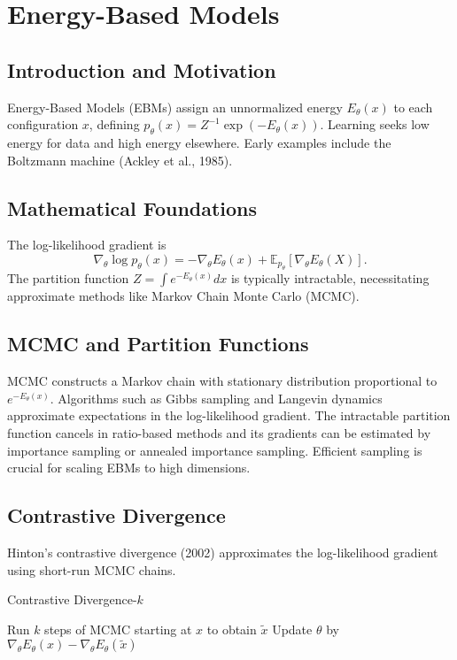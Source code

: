 \documentclass[11pt]{book}
\begin{document}
\section{Energy-Based Models}
\subsection{Introduction and Motivation}
Energy-Based Models (EBMs) assign an unnormalized energy $E_\theta(x)$ to each configuration $x$, defining $p_\theta(x)=Z^{-1}\exp(-E_\theta(x))$. Learning seeks low energy for data and high energy elsewhere. Early examples include the Boltzmann machine (Ackley et al., 1985).

\subsection{Mathematical Foundations}
The log-likelihood gradient is
\begin{equation}
\nabla_\theta \log p_\theta(x)= -\nabla_\theta E_\theta(x)+\mathbb{E}_{p_\theta}[\nabla_\theta E_\theta(X)].
\end{equation}
The partition function $Z=\int e^{-E_\theta(x)}dx$ is typically intractable, necessitating approximate methods like Markov Chain Monte Carlo (MCMC).

\subsection{MCMC and Partition Functions}
MCMC constructs a Markov chain with stationary distribution proportional to $e^{-E_\theta(x)}$. Algorithms such as Gibbs sampling and Langevin dynamics approximate expectations in the log-likelihood gradient. The intractable partition function cancels in ratio-based methods and its gradients can be estimated by importance sampling or annealed importance sampling. Efficient sampling is crucial for scaling EBMs to high dimensions.

\subsection{Contrastive Divergence}
Hinton's contrastive divergence (2002) approximates the log-likelihood gradient using short-run MCMC chains.
\begin{algorithm}
\caption{Contrastive Divergence-$k$}
\begin{algorithmic}[1]
    \STATE Run $k$ steps of MCMC starting at $x$ to obtain $\tilde{x}$
    \STATE Update $\theta$ by $\nabla_\theta E_\theta(x)-\nabla_\theta E_\theta(\tilde{x})$
\ENDFOR
\end{algorithmic}
\end{algorithm}
\end{document}
